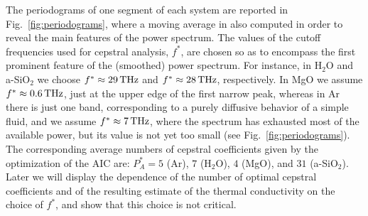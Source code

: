 The periodograms of one segment of each system are reported in Fig.~\ref{fig:periodograms}, where a moving average in also computed in order to reveal the main features of the power spectrum. 
The values of the cutoff frequencies used for cepstral analysis, $f^*$, are chosen so as to encompass the first prominent feature of the (smoothed) power spectrum. For instance, in H$_2$O and a-SiO$_2$ we choose $f^*\approx 29\,\mathrm{THz}$ and $f^*\approx 28\,\mathrm{THz}$, respectively. In MgO we assume $f^*\approx 0.6\,\mathrm{THz}$, just at the upper edge of the first narrow peak, whereas in Ar there is just one band, corresponding to a purely diffusive behavior of a simple fluid, and we assume $f^*\approx 7\,\mathrm{THz}$, where the spectrum has exhausted most of the available power, but its value is not yet too small (see Fig.~\ref{fig:periodograms}). The corresponding average numbers of cepstral coefficients given by the optimization of the AIC are: $P_A^*=5$ (Ar), $7$ (H$_2$O), $4$ (MgO), and $31$ (a-SiO$_2$). Later we will display the dependence of the number of optimal cepstral coefficients and of the resulting estimate of the thermal conductivity on the choice of $f^*$, and show that this choice is not critical.

